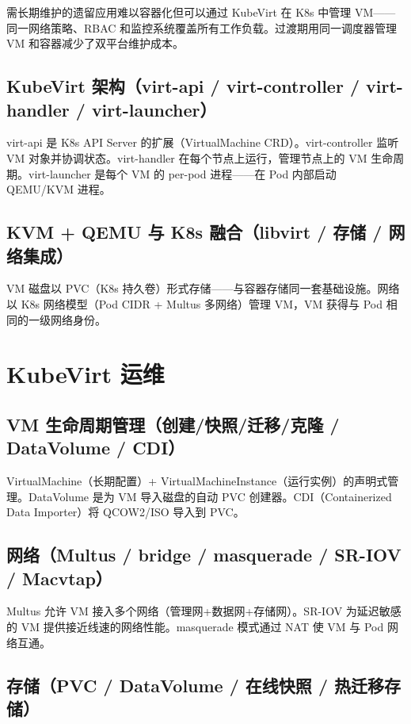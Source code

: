 \documentclass[12pt,UTF8]{ctexbook}
\begin{document}
需长期维护的遗留应用难以容器化但可以通过 KubeVirt 在 K8s 中管理 VM——同一网络策略、RBAC 和监控系统覆盖所有工作负载。过渡期用同一调度器管理 VM 和容器减少了双平台维护成本。

    \subsection{KubeVirt 架构（virt-api / virt-controller / virt-handler / virt-launcher）}

virt-api 是 K8s API Server 的扩展（VirtualMachine CRD）。virt-controller 监听 VM 对象并协调状态。virt-handler 在每个节点上运行，管理节点上的 VM 生命周期。virt-launcher 是每个 VM 的 per-pod 进程——在 Pod 内部启动 QEMU/KVM 进程。

    \subsection{KVM + QEMU 与 K8s 融合（libvirt / 存储 / 网络集成）}

VM 磁盘以 PVC（K8s 持久卷）形式存储——与容器存储同一套基础设施。网络以 K8s 网络模型（Pod CIDR + Multus 多网络）管理 VM，VM 获得与 Pod 相同的一级网络身份。

  \section{KubeVirt 运维}
    \subsection{VM 生命周期管理（创建/快照/迁移/克隆 / DataVolume / CDI）}

VirtualMachine（长期配置）+ VirtualMachineInstance（运行实例）的声明式管理。DataVolume 是为 VM 导入磁盘的自动 PVC 创建器。CDI（Containerized Data Importer）将 QCOW2/ISO 导入到 PVC。

    \subsection{网络（Multus / bridge / masquerade / SR-IOV / Macvtap）}

Multus 允许 VM 接入多个网络（管理网+数据网+存储网）。SR-IOV 为延迟敏感的 VM 提供接近线速的网络性能。masquerade 模式通过 NAT 使 VM 与 Pod 网络互通。

    \subsection{存储（PVC / DataVolume / 在线快照 / 热迁移存储）}
\end{document}
